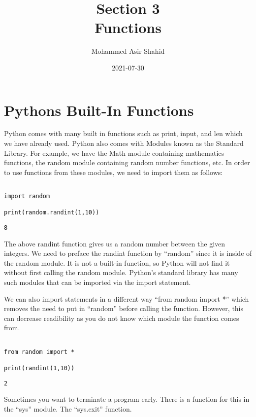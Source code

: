 \documentclass[11pt]{article}
\author{Mohammed Asir Shahid}
\date{2021-07-30}
\title{Section 3\\\medskip
\large Functions}
\begin{document}
\maketitle
\tableofcontents


\section{Pythons Built-In Functions}
\label{sec:org9181d71}

Python comes with many built in functions such as print, input, and len which we have already used. Python also comes with Modules known as the Standard Library. For example, we have the Math module containing mathematics functions, the random module containing random number functions, etc. In order to use functions from these modules, we need to import them as follows:

\begin{verbatim}

import random

print(random.randint(1,10))

\end{verbatim}

\begin{verbatim}
8
\end{verbatim}


The above randint function gives us a random number between the given integers. We need to preface the randint function by ``random'' since it is inside of the random module. It is not a built-in function, so Python will not find it without first calling the random module. Python's standard library has many such modules that can be imported via the import statement.

We can also import statements in a different way ``from random import *'' which removes the need to put in ``random'' before calling the function. However, this can decrease readibility as you do not know which module the function comes from.

\begin{verbatim}

from random import *

print(randint(1,10))

\end{verbatim}

\begin{verbatim}
2
\end{verbatim}


Sometimes you want to terminate a program early. There is a function for this in the ``sys'' module. The ``sys.exit'' function.
\end{document}
